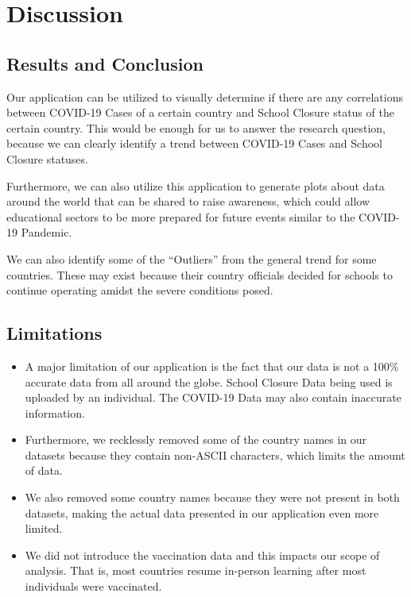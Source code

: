 \documentclass[fontsize=11pt]{article}
\begin{document}
    \section{Discussion}

    \subsection{Results and Conclusion}

    Our application can be utilized to visually determine if there are any correlations between COVID-19 Cases of a certain country and School Closure status of the certain country. This would be enough for us to answer the research question, because we can clearly identify a trend between COVID-19 Cases and School Closure statuses.

    Furthermore, we can also utilize this application to generate plots about data around the world that can be shared to raise awareness, which could allow educational sectors to be more prepared for future events similar to the COVID-19 Pandemic.

    We can also identify some of the ``Outliers'' from the general trend for some countries. These may exist because their country officials decided for schools to continue operating amidst the severe conditions posed.

    \subsection{Limitations}

    \begin{itemize}
        \item A major limitation of our application is the fact that our data is not a 100\% accurate data from all around the globe. School Closure Data being used is uploaded by an individual. The COVID-19 Data may also contain inaccurate information.
        \item Furthermore, we recklessly removed some of the country names in our datasets because they contain non-ASCII characters, which limits the amount of data.
        \item We also removed some country names because they were not present in both datasets, making the actual data presented in our application even more limited.
        \item We did not introduce the vaccination data and this impacts our scope of analysis. That is, most countries resume in-person learning after most individuals were vaccinated.
    \end{itemize}
\end{document}
